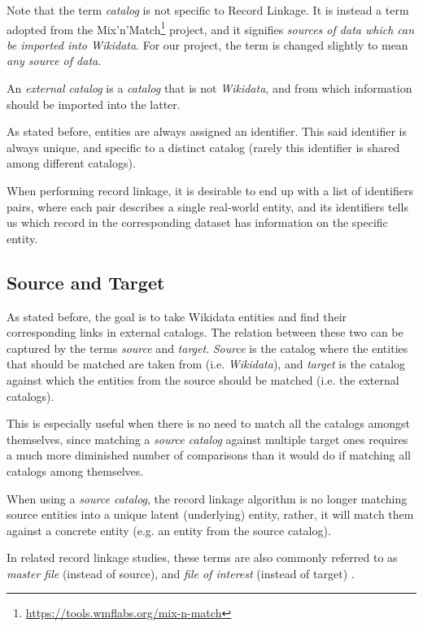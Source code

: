 \documentclass[epsfig,a4paper,11pt,titlepage,twoside,openany]{book}
\newcommand{\footurl}[1]{\footnote{\url{#1}}}
\begin{document}
Note that the term \textit{catalog} is not specific to Record Linkage. It is instead a term adopted from the Mix'n'Match\footurl{https://tools.wmflabs.org/mix-n-match} project, and it signifies \textit{sources of data which can be imported into Wikidata}. For our project, the term is changed slightly to mean \textit{any source of data}. 

An \textit{external catalog} is a \textit{catalog} that is not \textit{Wikidata}, and from which information should be imported into the latter.

As stated before, entities are always assigned an identifier. This said identifier is always unique, and specific to a distinct catalog (rarely this identifier is shared among different catalogs). 

When performing record linkage, it is desirable to end up with a list of identifiers pairs, where each pair describes a single real-world entity, and its identifiers tells us which record in the corresponding dataset has information on the specific entity.


\subsection{Source and Target}
\label{sec:rl-term-source-and-target}

As stated before, the goal is to take Wikidata entities and find their corresponding links in external catalogs. The relation between these two can be captured by the terms \textit{source} and \textit{target}. \textit{Source} is the catalog where the entities that should be matched are taken from (i.e. \textit{Wikidata}), and \textit{target} is the catalog against which the entities from the source should be matched (i.e. the external catalogs).

This is especially useful when there is no need to match all the catalogs amongst
themselves, since matching a \textit{source catalog} against multiple target ones
requires a much more diminished number of comparisons than it would do if matching all catalogs among themselves.

When using a \textit{source catalog}, the record linkage algorithm is no longer matching
source entities into a unique latent (underlying) entity, rather, it will match
them against a concrete entity (e.g. an entity from the source catalog).

In related record linkage studies, these terms are also commonly referred to as \cite{Sayers2015}
\textit{master file} (instead of source), and \textit{file of interest} (instead
of target) .
   
\end{document}
